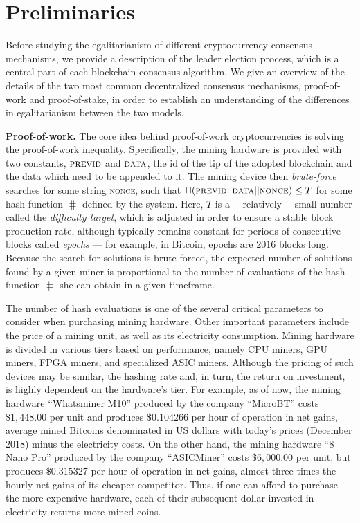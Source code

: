 \section{Preliminaries}\label{sec:preliminaries}

Before studying the egalitarianism of different cryptocurrency consensus mechanisms, we
provide a description of the leader election process, which is a central part
of each blockchain consensus algorithm. We give an
overview of the details of the two most common decentralized consensus mechanisms,
proof-of-work and proof-of-stake, in order to establish an understanding of the
differences in egalitarianism between the two models.

\noindent\textbf{Proof-of-work.}
The core idea behind proof-of-work cryptocurrencies is solving the
proof-of-work inequality.  Specifically, the mining hardware is provided with
two constants, $\textsc{previd}$ and $\textsc{data}$, \ie the id of the
tip of the adopted blockchain and the data which need to be appended to it.  The mining
device then \emph{brute-force} searches for some string \textsc{nonce}, such
that $\mathsf{H}(\textsc{previd} || \textsc{data} || \textsc{nonce}) \leq T$ for
some hash function $\hash$ defined by the system. Here, $T$ is a
---relatively--- small number called the \emph{difficulty target}, which is
adjusted in order to ensure a stable block production rate, although typically
remains constant for periods of consecutive blocks called \emph{epochs} --- for
example, in Bitcoin, epochs are $2016$ blocks long. Because the search for
solutions is brute-forced, the expected number of solutions found by a given
miner is proportional to the number of evaluations of the
hash function $\hash$ she can obtain in a given timeframe.

The number of hash evaluations is one of the several critical parameters to
consider when purchasing mining hardware. Other important parameters include
the price of a mining unit, as well as its electricity consumption.  Mining
hardware is divided in various tiers based on performance, namely CPU miners,
GPU miners, FPGA miners, and specialized ASIC miners.  Although the pricing of
such devices may be similar, the hashing rate and, in turn, the return on
investment, is highly dependent on the hardware's tier.  For example, as of
now, the mining hardware ``Whatsminer M10'' produced by the company ``MicroBT''
costs $\$1{,}448.00$ per unit and produces $\$0.104266$ per hour of operation in
net gains, \ie average mined Bitcoins denominated in US dollars with today's
prices (December 2018) minus the electricity costs. On the other hand, the
mining hardware ``8 Nano Pro'' produced by the company ``ASICMiner'' costs
$\$6{,}000.00$ per unit, but produces $\$0.315327$ per hour of operation in net
gains, \ie almost three times the hourly net gains of its cheaper competitor.
Thus, if one can afford to purchase the more expensive hardware, each of their
subsequent dollar invested in electricity returns more mined coins.


